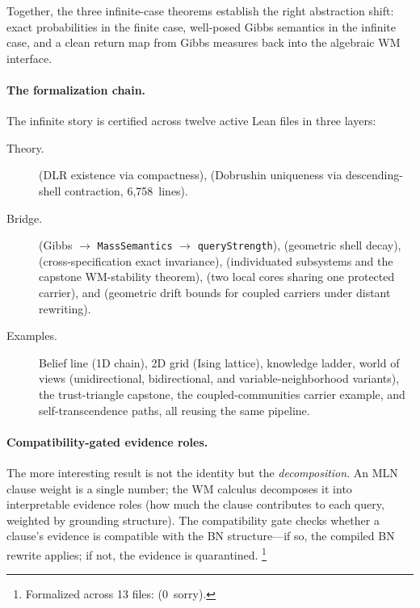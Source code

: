 \documentclass[11pt,openany]{report}
\begin{document}
\noindent
Together, the three infinite-case theorems establish the right abstraction
shift: exact probabilities in the finite case, well-posed Gibbs semantics in
the infinite case, and a clean return map from Gibbs measures back into the
algebraic WM interface.

\paragraph{The formalization chain.}
The infinite story is certified across twelve active Lean files in three
layers:
\begin{description}
\item[Theory.]   (DLR existence
  via compactness),  (Dobrushin
  uniqueness via descending-shell contraction, 6{,}758~lines).
\item[Bridge.]   (Gibbs
  $\to$ \texttt{MassSemantics} $\to$ \texttt{queryStrength}),
   (geometric shell
  decay),  (cross-specification
  exact invariance),  (individuated
  subsystems and the capstone WM-stability theorem),
   (two local cores sharing one
  protected carrier), and 
  (geometric drift bounds for coupled carriers under distant rewriting).
\item[Examples.]  Belief line (1D chain), 2D grid (Ising lattice),
  knowledge ladder, world of views (unidirectional, bidirectional, and
  variable-neighborhood variants), the trust-triangle capstone, the
  coupled-communities carrier example, and self-transcendence paths, all
  reusing the same pipeline.
\end{description}

\paragraph{Compatibility-gated evidence roles.}
The more interesting result is not the identity but the
\emph{decomposition}.  An MLN clause weight is a single number;
the WM calculus decomposes it into interpretable evidence roles
(how much the clause contributes to each query, weighted by
grounding structure).  The compatibility gate checks whether a
clause's evidence is compatible with the BN structure---if so,
the compiled BN rewrite applies; if not, the evidence is
quarantined.%
\footnote{Formalized across 13 files:
(0~sorry).}
\end{document}
